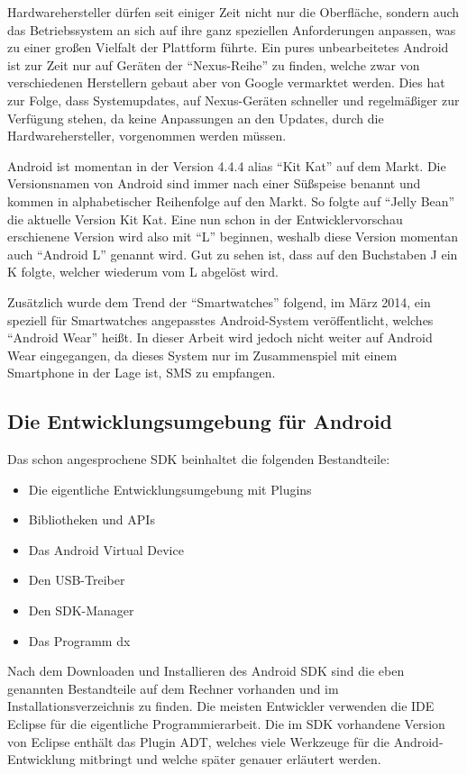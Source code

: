 Hardwarehersteller d\"urfen seit einiger Zeit nicht nur die Oberfl\"ache, sondern auch das Betriebssystem an sich auf ihre ganz speziellen Anforderungen anpassen, was zu einer gro\ss{}en Vielfalt der Plattform f\"uhrte. Ein pures unbearbeitetes Android ist zur Zeit nur auf Ger\"aten der "`Nexus-Reihe"' zu finden, welche zwar von verschiedenen Herstellern gebaut aber von Google vermarktet werden. Dies hat zur Folge, dass Systemupdates, auf Nexus-Ger\"aten schneller und regelm\"a\ss{}iger zur Verf\"ugung stehen, da keine Anpassungen an den Updates, durch die Hardwarehersteller, vorgenommen werden m\"ussen.

Android ist momentan in der Version 4.4.4 alias "`Kit Kat"' auf dem Markt. Die Versionsnamen von Android sind immer nach einer S\"u\ss{}speise benannt und kommen in alphabetischer Reihenfolge auf den Markt. So folgte auf "`Jelly Bean"' die aktuelle Version Kit Kat. Eine nun schon in der Entwicklervorschau erschienene Version wird also mit "`L"' beginnen, weshalb diese Version momentan auch "`Android L"' genannt wird. Gut zu sehen ist, dass auf den Buchstaben J ein K folgte, welcher wiederum vom L abgel\"ost wird. \cite{WikiAndroid} \cite{Jung13}

Zus\"atzlich wurde dem Trend der "`Smartwatches"' folgend, im M\"arz 2014, ein speziell f\"ur Smartwatches angepasstes Android-System ver\"offentlicht, welches "`Android Wear"' hei\ss{}t. In dieser Arbeit wird jedoch nicht weiter auf Android Wear eingegangen, da dieses System nur im Zusammenspiel mit einem Smartphone in der Lage ist, SMS zu empfangen. \cite{NextAndroidWear}

\subsection{Die Entwicklungsumgebung f\"ur Android}
Das schon angesprochene \ac{SDK} beinhaltet die folgenden Bestandteile:
\begin{itemize}
 \item Die eigentliche Entwicklungsumgebung mit Plugins
 \item Bibliotheken und APIs
 \item Das Android Virtual Device
 \item Den USB-Treiber 
 \item Den SDK-Manager
 \item Das Programm dx
 
\end{itemize}

Nach dem Downloaden und Installieren des Android \ac{SDK} sind die eben genannten Bestandteile auf dem Rechner vorhanden und im Installationsverzeichnis zu finden. Die meisten Entwickler verwenden die \ac{IDE} Eclipse f\"ur die eigentliche Programmierarbeit. Die im \ac{SDK} vorhandene Version von Eclipse enth\"alt das Plugin \ac{ADT}, welches viele Werkzeuge f\"ur die Android-Entwicklung mitbringt und welche sp\"ater genauer erl\"autert werden.

